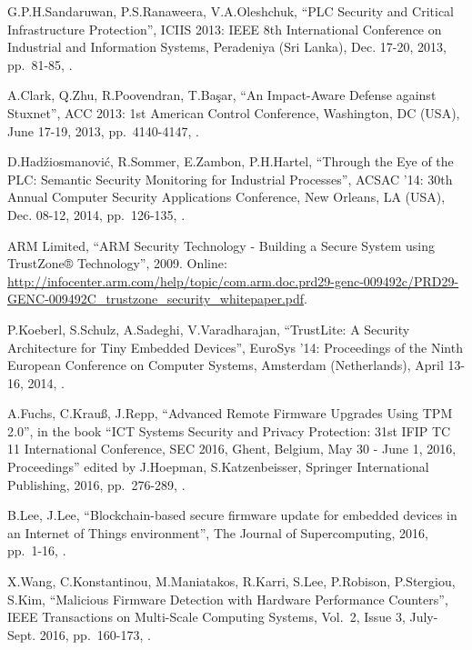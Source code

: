 \begin{thebibliography}{99}
G.P.H.Sandaruwan, P.S.Ranaweera, V.A.Oleshchuk,
``PLC Security and Critical Infrastructure Protection'',
ICIIS 2013: IEEE 8th International Conference on Industrial and Information Systems,
Peradeniya (Sri Lanka), Dec. 17-20, 2013,
pp.\ 81-85,
.

A.Clark, Q.Zhu, R.Poovendran, T.Başar,
``An Impact-Aware Defense against Stuxnet'',
ACC 2013: 1st American Control Conference,
Washington, DC (USA), June 17-19, 2013,
pp.\ 4140-4147,
.

D.Hadžiosmanović, R.Sommer, E.Zambon, P.H.Hartel,
``Through the Eye of the PLC: Semantic Security Monitoring for Industrial Processes'',
ACSAC '14: 30th Annual Computer Security Applications Conference,
New Orleans, LA (USA), Dec. 08-12, 2014,
pp.\ 126-135,
.

ARM Limited,
``ARM Security Technology - Building a Secure System using TrustZone® Technology'',
2009.
Online: \url{http://infocenter.arm.com/help/topic/com.arm.doc.prd29-genc-009492c/PRD29-GENC-009492C_trustzone_security_whitepaper.pdf}.

P.Koeberl, S.Schulz, A.Sadeghi, V.Varadharajan,
``TrustLite: A Security Architecture for Tiny Embedded Devices'',
EuroSys '14: Proceedings of the Ninth European Conference on Computer Systems,
Amsterdam (Netherlands), April 13-16, 2014,
.

A.Fuchs, C.Krau{\ss}, J.Repp,
``Advanced Remote Firmware Upgrades Using TPM 2.0'',
in the book ``ICT Systems Security and Privacy Protection: 31st IFIP TC 11 International Conference, SEC 2016, Ghent, Belgium, May 30 - June 1, 2016, Proceedings''
edited by J.Hoepman, S.Katzenbeisser,
Springer International Publishing, 2016,
pp.\ 276-289,
.

B.Lee, J.Lee,
``Blockchain-based secure firmware update for embedded devices in an Internet of Things environment'',
The Journal of Supercomputing, 2016,
pp.\ 1-16,
.

X.Wang, C.Konstantinou, M.Maniatakos, R.Karri, S.Lee, P.Robison, P.Stergiou, S.Kim,
``Malicious Firmware Detection with Hardware Performance Counters'',
IEEE Transactions on Multi-Scale Computing Systems,
Vol.\ 2, Issue 3,
July-Sept. 2016,
pp.\ 160-173,
.


\end{thebibliography}
